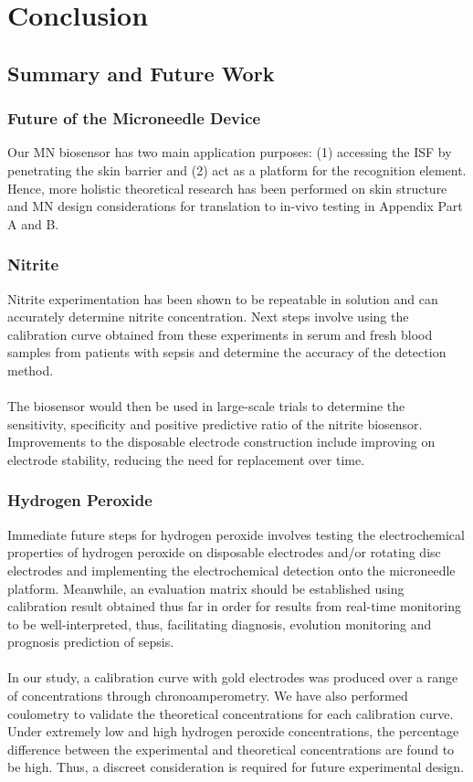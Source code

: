 \section{Conclusion}





\subsection{Summary and Future Work}
\subsubsection{Future of the Microneedle Device}
Our MN biosensor has two main application purposes: (1) accessing the ISF by penetrating the skin barrier and (2) act as a platform for the recognition element.  Hence, more holistic theoretical research has been performed on skin structure and MN design considerations for translation to in-vivo testing in Appendix Part A and B.
\subsubsection{Nitrite}
 Nitrite experimentation has been shown to be repeatable in solution and can accurately determine nitrite concentration. Next steps involve using the calibration curve obtained from these experiments in serum and fresh blood samples from patients with sepsis and determine the accuracy of the detection method.\\\\
 The biosensor would then be used in large-scale trials to determine the sensitivity, specificity and positive predictive ratio of the nitrite biosensor. Improvements to the disposable electrode construction include improving on electrode stability, reducing the need for replacement over time.
\subsubsection{Hydrogen Peroxide}
Immediate future steps for hydrogen peroxide involves testing the electrochemical properties of hydrogen peroxide on disposable electrodes and/or rotating disc electrodes and implementing the electrochemical detection onto the microneedle platform. Meanwhile, an evaluation matrix should be established using calibration result obtained thus far in order for results from real-time monitoring to be well-interpreted, thus, facilitating diagnosis, evolution monitoring and prognosis prediction of sepsis.\\\\
In our study, a calibration curve with gold electrodes was produced over a range of concentrations through chronoamperometry. We have also performed coulometry to validate the theoretical concentrations for each calibration curve. Under extremely low and high hydrogen peroxide concentrations, the percentage difference between the experimental and theoretical concentrations are found to be high. Thus, a discreet consideration is required for future experimental design.
